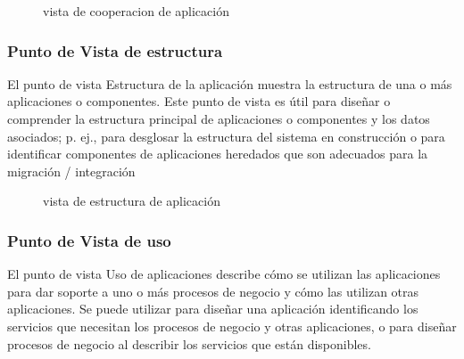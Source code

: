 \begin{figure}[th!]
	\centering
	\caption{vista de cooperacion de aplicación}
	\label{fig:vistaaplicacion}
\end{figure}

\subsubsection{Punto de Vista de estructura}
El punto de vista Estructura de la aplicación muestra la estructura de una o más aplicaciones o componentes. 
Este punto de vista es útil para diseñar o comprender la estructura principal de aplicaciones o componentes y los datos asociados; p. ej., para desglosar la estructura del sistema en construcción o para identificar componentes de aplicaciones heredados que son adecuados para la migración / integración
\begin{figure}[th!]
	\centering
	\caption{vista de estructura de aplicación}
	\label{fig:vistaaplicacion}
\end{figure}	

\subsubsection{Punto de Vista de uso}
El punto de vista Uso de aplicaciones describe cómo se utilizan las aplicaciones para dar soporte a uno o más procesos de negocio y cómo las utilizan otras aplicaciones. 
Se puede utilizar para diseñar una aplicación identificando los servicios que necesitan los procesos de negocio y otras aplicaciones, o para diseñar procesos de negocio al describir los servicios que están disponibles. 